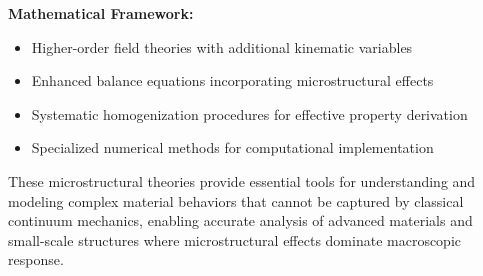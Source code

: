 \begin{subox}[Summary]
\textbf{Mathematical Framework:}
\begin{itemize}
\item Higher-order field theories with additional kinematic variables
\item Enhanced balance equations incorporating microstructural effects
\item Systematic homogenization procedures for effective property derivation
\item Specialized numerical methods for computational implementation
\end{itemize}

These microstructural theories provide essential tools for understanding and modeling complex material behaviors that cannot be captured by classical continuum mechanics, enabling accurate analysis of advanced materials and small-scale structures where microstructural effects dominate macroscopic response.
\end{subox}